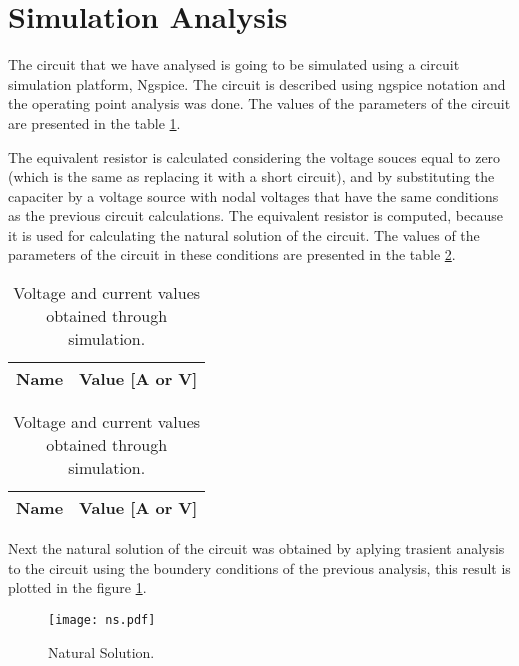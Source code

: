 \section{Simulation Analysis}
\label{sec:simulation}

The circuit that we have analysed is going to be simulated using a circuit simulation platform, Ngspice. The circuit is described using ngspice notation and the operating point analysis was done. The values of the parameters of the circuit are presented in the table \ref{tab:op}.


The equivalent resistor is calculated considering the voltage souces equal to zero (which is the same as replacing it with a short circuit), and by substituting the capaciter by a voltage source with nodal voltages that have the same conditions as the previous circuit calculations. The equivalent resistor is computed, because it is used for calculating the natural solution of the circuit. The values of the parameters of the circuit in these conditions are presented in the table \ref{tab:opV0}.


\begin{table}[H]
  \centering
  \begin{tabular}{|l|r|}
    \hline    
    {\bf Name} & {\bf Value [A or V]} \\ \hline
    
  \end{tabular}
  \caption{Voltage and current values obtained through simulation.}
  \label{tab:op}
\end{table}


\begin{table}[H]
  \centering
  \begin{tabular}{|l|r|}
    \hline    
    {\bf Name} & {\bf Value [A or V]} \\ \hline
    
  \end{tabular}
  \caption{Voltage and current values obtained through simulation.}
  \label{tab:opV0}
\end{table}


Next the natural solution of the circuit was obtained by aplying trasient analysis to the circuit using the boundery conditions of the previous analysis, this result is plotted in the figure \ref{Fig1:ns}.


\begin{figure}[H] \centering
\texttt{[image: ns.pdf]}
\caption{Natural Solution.}
\label{Fig1:ns}
\end{figure}



